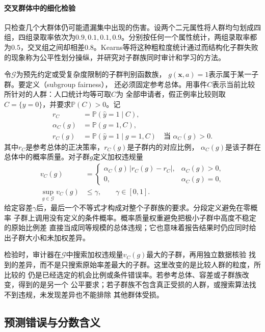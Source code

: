 \paragraph{交叉群体中的细化检验}

只检查几个大群体仍可能遗漏集中出现的伤害。设两个二元属性将人群均匀划成四组，四组录取率依次为$0.9,0.1,0.1,0.9$。分别按任何一个属性统计，两组录取率都为$0.5$，交叉组之间却相差$0.8$。Kearns等将这种粗粒度统计通过而结构化子群失败的现象称为公平性划分操纵，并研究对子群族同时审计和学习的方法。

令$\mathcal G$为预先约定或受复杂度限制的子群判别函数族，
$g(\bm{x},a)=1$表示属于某一子群。要定义（subgroup fairness），
还必须固定参考总体。用事件$C$表示当前比较所针对的人群：人口统计均等可取$C$为
全部申请者，假正例率比较则取$C=\{y=0\}$，并要求$\mathbb P(C)>0$。记
\begin{align*}
 r_C&=\mathbb P(\hat y=1\mid C),\\
 \alpha_C(g)&=\mathbb P(g=1,C),\\
 r_C(g)&=\mathbb P(\hat y=1\mid g=1,C)
 \quad\text{当 }\alpha_C(g)>0.
\end{align*}
其中$r_C$是参考总体的正决策率，$r_C(g)$是子群内的对应比例，
$\alpha_C(g)$是该子群在总体中的概率质量。对子群$g$定义加权违规量
\begin{equation}
 \begin{aligned}
 v_C(g)&=
 \begin{cases}
  \alpha_C(g)\,|r_C(g)-r_C|,&\alpha_C(g)>0,\\
  0,&\alpha_C(g)=0,
 \end{cases}\\
 \sup_{g\in\mathcal G}v_C(g)&\leq\gamma,\qquad \gamma\in[0,1].
 \end{aligned}
 \label{eq:fairness-subgroup-violation}
\end{equation}
给定容差$\gamma$后，最后一个不等式才构成对整个子群族的要求。分段定义避免在零概率
子群上调用没有定义的条件概率。概率质量权重避免把极小子群中高度不稳定的原始比例差
直接当成同等规模的总体违规；它也意味着报告结果时仍应同时给出子群大小和未加权差异。

检验时，审计器在$\mathcal G$中搜索加权违规量$v_C(g)$最大的子群，再用独立数据核验
找到的差异，而不是只搜索原始率差最大的子群。这里改变的是比较人群的粒度，所比较的
仍是已经选定的机会比例或条件错误率。若参考总体、容差或子群族改变，得到的是另一个
公平要求；若子群族不包含真正受损的人群，或搜索算法找不到违规，未发现差异也不能排除
其他群体受损。

\subsection{预测错误与分数含义}
\label{sec:fairness-prediction-comparison}

